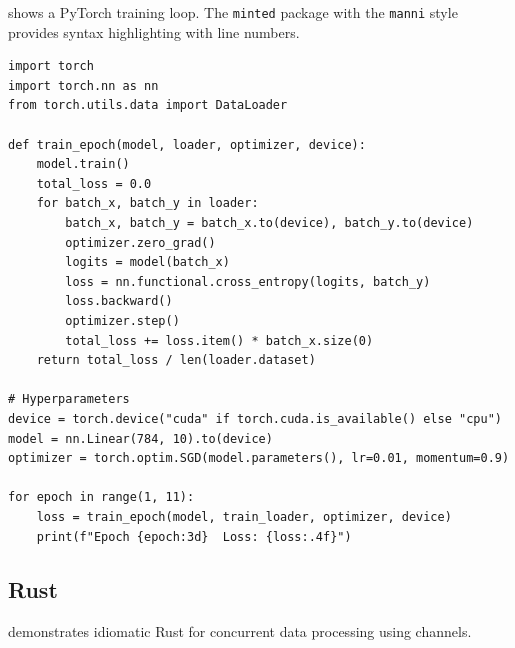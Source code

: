 \documentclass[
    language=english,
    doctype=article,
    institution=none,
    titlestyle=book,
]{../../omnilatex}
\theoremstyle{definition}
\theoremstyle{definition}
\theoremstyle{remark}
\begin{document}
 shows a PyTorch training loop.  The \texttt{minted} package
with the \texttt{manni} style provides syntax highlighting with line numbers.

\begin{listing}[htbp]
    \centering
    \begin{verbatim}
import torch
import torch.nn as nn
from torch.utils.data import DataLoader

def train_epoch(model, loader, optimizer, device):
    model.train()
    total_loss = 0.0
    for batch_x, batch_y in loader:
        batch_x, batch_y = batch_x.to(device), batch_y.to(device)
        optimizer.zero_grad()
        logits = model(batch_x)
        loss = nn.functional.cross_entropy(logits, batch_y)
        loss.backward()
        optimizer.step()
        total_loss += loss.item() * batch_x.size(0)
    return total_loss / len(loader.dataset)

# Hyperparameters
device = torch.device("cuda" if torch.cuda.is_available() else "cpu")
model = nn.Linear(784, 10).to(device)
optimizer = torch.optim.SGD(model.parameters(), lr=0.01, momentum=0.9)

for epoch in range(1, 11):
    loss = train_epoch(model, train_loader, optimizer, device)
    print(f"Epoch {epoch:3d}  Loss: {loss:.4f}")
    \end{verbatim}
    \caption{PyTorch training loop for a linear classifier on MNIST.}
    \label{lst:python}
\end{listing}


\subsection{Rust}
\label{sec:rust}

 demonstrates idiomatic Rust for concurrent data processing
using channels.
\end{document}
